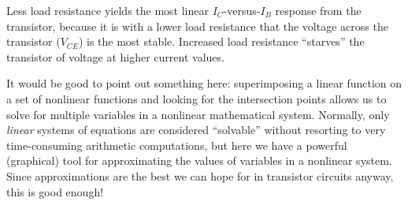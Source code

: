 Less load resistance yields the most linear $I_C$-versus-$I_B$ response from the transistor, because it is with a lower load resistance that the voltage across the transistor ($V_{CE}$) is the most stable.  Increased load resistance ``starves'' the transistor of voltage at higher current values.







It would be good to point out something here: superimposing a linear function on a set of nonlinear functions and looking for the intersection points allows us to solve for multiple variables in a nonlinear mathematical system.  Normally, only {\it linear} systems of equations are considered ``solvable'' without resorting to very time-consuming arithmetic computations, but here we have a powerful (graphical) tool for approximating the values of variables in a nonlinear system.  Since approximations are the best we can hope for in transistor circuits anyway, this is good enough!




